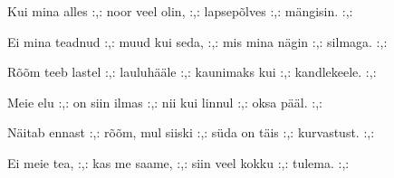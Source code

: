 Kui mina alles :,: noor veel olin, :,:
lapsep\~olves :,: m\"angisin. :,:

Ei mina teadnud :,: muud kui seda, :,: 
mis mina n\"agin :,: silmaga. :,:

R\~o\~om teeb lastel :,: lauluh\"a\"ale :,:
kaunimaks kui :,: kandlekeele. :,:

Meie elu :,: on siin ilmas :,:
nii kui linnul :,: oksa p\"a\"al. :,:

N\"aitab ennast :,: r\~o\~om, mul siiski :,:
s\"uda on t\"ais :,: kurvastust. :,:

Ei meie tea, :,: kas me saame, :,:
siin veel kokku :,: tulema. :,: